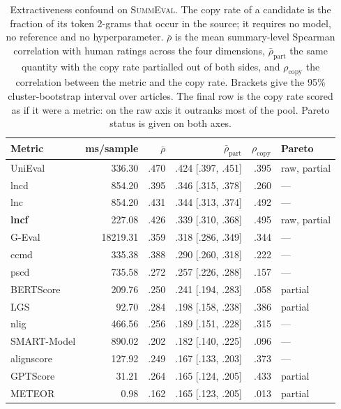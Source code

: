 \begin{table}[t]
\centering
\caption{Extractiveness confound on \textsc{SummEval}. The copy rate of a candidate is the fraction of its token 2-grams that occur in the source; it requires no model, no reference and no hyperparameter. $\bar{\rho}$ is the mean summary-level Spearman correlation with human ratings across the four dimensions, $\bar{\rho}_{\mathrm{part}}$ the same quantity with the copy rate partialled out of both sides, and $\rho_{\mathrm{copy}}$ the correlation between the metric and the copy rate. Brackets give the 95\% cluster-bootstrap interval over articles. The final row is the copy rate scored as if it were a metric: on the raw axis it outranks most of the pool. Pareto status is given on both axes.}
\label{tab:confound}
\small
\linespread{1}\selectfont
\setlength{\tabcolsep}{4pt}
\begin{tabular}{@{}lrrrrl@{}}
\toprule
Metric & ms/sample & $\bar{\rho}$ & $\bar{\rho}_{\mathrm{part}}$ & $\rho_{\mathrm{copy}}$ & Pareto \\
\midrule
UniEval & 336.30 & .470 & .424 {\scriptsize [.397, .451]} & .395 & raw, partial \\
lncd & 854.20 & .395 & .346 {\scriptsize [.315, .378]} & .260 & --- \\
lnc & 854.20 & .431 & .344 {\scriptsize [.313, .374]} & .492 & --- \\
\textbf{lncf} & 227.08 & .426 & .339 {\scriptsize [.310, .368]} & .495 & raw, partial \\
G-Eval & 18219.31 & .359 & .318 {\scriptsize [.286, .349]} & .344 & --- \\
ccmd & 335.38 & .388 & .290 {\scriptsize [.260, .318]} & .222 & --- \\
pscd & 735.58 & .272 & .257 {\scriptsize [.226, .288]} & .157 & --- \\
BERTScore & 209.76 & .250 & .241 {\scriptsize [.194, .283]} & .058 & partial \\
LGS & 92.70 & .284 & .198 {\scriptsize [.158, .238]} & .386 & partial \\
nlig & 466.56 & .256 & .189 {\scriptsize [.151, .228]} & .315 & --- \\
SMART-Model & 890.02 & .202 & .182 {\scriptsize [.140, .225]} & .096 & --- \\
alignscore & 127.92 & .249 & .167 {\scriptsize [.133, .203]} & .373 & --- \\
GPTScore & 31.21 & .264 & .165 {\scriptsize [.124, .205]} & .433 & partial \\
METEOR & 0.98 & .162 & .165 {\scriptsize [.123, .205]} & .013 & partial \\

\end{tabular}
\end{table}
